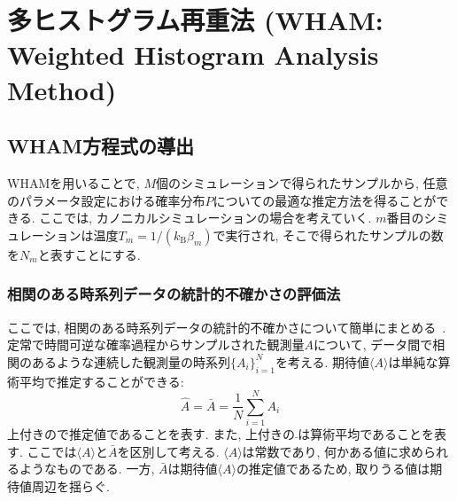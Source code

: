 \section{多ヒストグラム再重法 (WHAM: Weighted Histogram Analysis Method)}

\subsection{WHAM方程式の導出}
WHAMを用いることで, $M$個のシミュレーションで得られたサンプルから, 任意のパラメータ設定における確率分布$P$についての最適な推定方法を得ることができる. 
ここでは, カノニカルシミュレーションの場合を考えていく. $m$番目のシミュレーションは温度$T_{m}=1/(k_{\mathrm{B}}\beta_{m})$で実行され, そこで得られたサンプルの数を$N_{m}$と表すことにする. 

\subsubsection{相関のある時系列データの統計的不確かさの評価法}
ここでは, 相関のある時系列データの統計的不確かさについて簡単にまとめる~\cite{Janke2002,Chodera2007}. 
定常で時間可逆な確率過程からサンプルされた観測量$A$について, データ間で相関のあるような連続した観測量の時系列$\{A_{i}\}_{i=1}^{N}$を考える. 
期待値$\langle A \rangle$は単純な算術平均で推定することができる:
\begin{equation}
    \hat{A} =
    \bar{A} =
    \frac{1}{N}\sum_{i=1}^{N} A_{i}
\end{equation}
上付きの$\hat{}$で推定値であることを表す. 
また, 上付きの$\bar{}$は算術平均であることを表す. 
ここでは$\langle A \rangle$と$\bar{A}$を区別して考える. 
$\langle A \rangle$は常数であり, 何かある値に求められるようなものである. 
一方, $\bar{A}$は期待値$\langle A \rangle$の推定値であるため, 取りうる値は期待値周辺を揺らぐ. 

